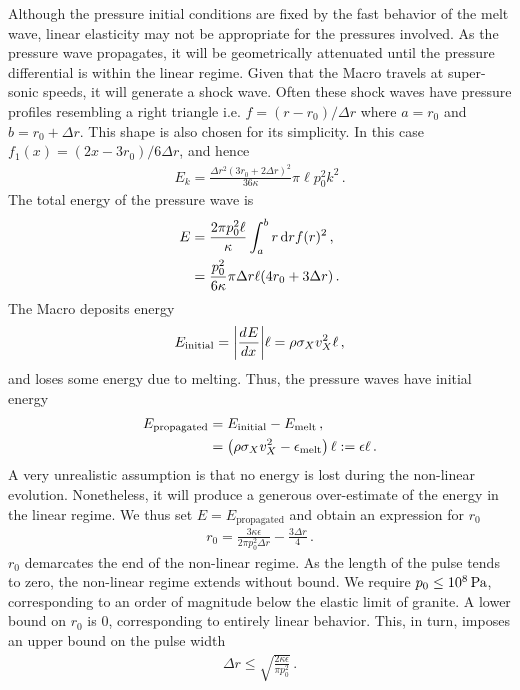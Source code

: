 \documentclass[prd,reprint,10pt,tightenlines]{revtex4-1}
\newcommand*\diff{\mathop{}\!\mathrm{d}}
\newcommand*\te[1]{\text{#1}}
\newcommand*\p[1]{\left(#1\right)}
\newcommand*\f[2]{\frac{#1}{#2}}
\newcommand*\td[3]{\frac{d^{#3}#1}{d #2^{#3}}}
\begin{document}
Although the pressure initial conditions are fixed by the fast behavior of the melt wave, linear elasticity may not be appropriate for the pressures involved. As the pressure wave propagates, it will be geometrically attenuated until the pressure differential is within the linear regime. Given that the Macro travels at super-sonic speeds, it will generate a shock wave. Often these shock waves have pressure profiles resembling a right triangle i.e. $f = \p{r - r_0}/\Delta r$ where $a = r_0$ and $b = r_0 + \Delta r$. This shape is also chosen for its simplicity. In this case $f_1(x) = \p{2 x-3r_0}/6\Delta r$, and hence
\begin{align}
E_k = \f{\Delta r^2(3r_0+2\Delta r)^2}{36 \kappa} \pi\ell p_0^2k^2\,.
\end{align}
The total energy of the pressure wave is
\begin{align}
E \notag&= \f{2\pi p_0^2\ell}{\kappa}\int_a^b r\diff r f(r)^2\,,\\
&=\f{p_0^2}{6\kappa}\pi\Delta r \ell(4r_0 + 3\Delta r)\,.
\end{align}
The Macro deposits energy
\begin{align}
E_\te{initial} = \abs{\td{E}{x}{}}\ell = \rho\sigma_X v_X^2\ell\,,
\end{align}
and loses some energy due to melting. Thus, the pressure waves have initial energy
\begin{align}
E_\te{propagated} \notag&= E_\te{initial} - E_\te{melt}\,,\\
&= \p{\rho\sigma_X v_X^2 - \epsilon_\te{melt}}\ell:=\epsilon\ell\,.
\end{align}
A very unrealistic assumption is that no energy is lost during the non-linear evolution. Nonetheless, it will produce a generous over-estimate of the energy in the linear regime. We thus set $E = E_\te{propagated}$ and obtain an expression for $r_0$
\begin{align}
r_0 =  \f{3\kappa\epsilon}{2\pi p_0^2\Delta r}-\f{3\Delta r}{4}\,.
\end{align}
$r_0$ demarcates the end of the non-linear regime. As the length of the pulse tends to zero, the non-linear regime extends without bound. We require $p_0\leq 10^8\te{\,Pa}$, corresponding to an order of magnitude below the elastic limit of granite. A lower bound on $r_0$ is 0, corresponding to entirely linear behavior. This, in turn, imposes an upper bound on the pulse width
\begin{align}
\Delta r\leq\sqrt{\f{2\kappa \epsilon}{\pi p_0^2}}\,.
\end{align}
\end{document}
